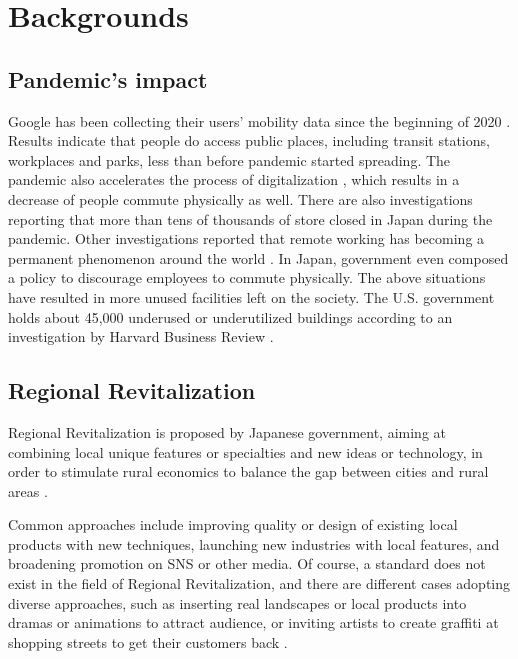 \chapter{Backgrounds} \label{ch:2}

\section{Pandemic's impact}

Google has been collecting their users' mobility data since the beginning of 2020 \cite{googlemobilityreports} \cite{ourworldindata_2020}.
Results indicate that people do access public places, including transit stations, workplaces and parks, less than before pandemic started spreading.
The pandemic also accelerates the process of digitalization \cite{amankwah-amoah_khan_wood_knight_2021}, which results in a decrease of people commute physically as well.
There are also investigations reporting that more than tens of thousands of store closed in Japan during the pandemic.
Other investigations reported that remote working has becoming a permanent phenomenon around the world \cite{saad_wigert_2021}.
In Japan, government even composed a policy to discourage employees to commute physically.
The above situations have resulted in more unused facilities left on the society.
The U.S. government holds about 45,000 underused or underutilized buildings according to an investigation by Harvard Business Review \cite{hounsell_2020}.

\section{Regional Revitalization}
Regional Revitalization is proposed by Japanese government, aiming at combining local unique features or specialties and new ideas or technology,
in order to stimulate rural economics to balance the gap between cities and rural areas \cite{sawaji_2019}.

Common approaches include improving quality or design of existing local products with new techniques, launching new industries with local features, and broadening promotion on SNS or other media.
Of course, a standard does not exist in the field of Regional Revitalization, and there are different cases adopting diverse approaches,
such as inserting real landscapes or local products into dramas or animations to attract audience,
or inviting artists to create graffiti at shopping streets to get their customers back \cite{中野経済新聞_2015}\cite{サンテレビニュース_2021}\cite{urbact_2019}.

